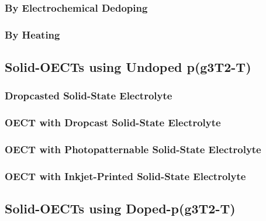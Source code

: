 \subsubsection{By Electrochemical Dedoping}

\subsubsection{By Heating}


\subsection{Solid-OECTs using Undoped p(g3T2-T)}




\subsubsection{Dropcasted Solid-State Electrolyte}

\subsubsection{OECT with Dropcast Solid-State Electrolyte}

\subsubsection{OECT with Photopatternable Solid-State Electrolyte}

\subsubsection{OECT with Inkjet-Printed Solid-State Electrolyte}


\subsection{Solid-OECTs using Doped-p(g3T2-T)}



